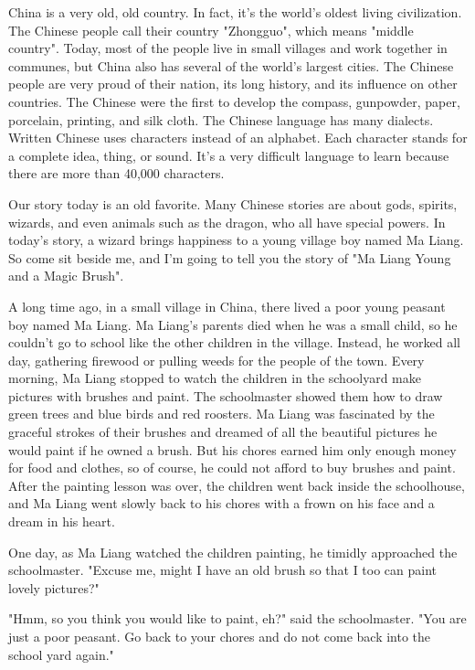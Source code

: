 China is a very old, old country. In fact, it's the world's oldest living civilization. The Chinese people call their country "Zhongguo", which means "middle country". Today, most of the people live in small villages and work together in communes, but China also has several of the world's largest cities. The Chinese people are very proud of their nation, its long history, and its influence on other countries. The Chinese were the first to develop the compass, gunpowder, paper, porcelain, printing, and silk cloth. The Chinese language has many dialects. Written Chinese uses characters instead of an alphabet. Each character stands for a complete idea, thing, or sound. It's a very difficult language to learn because there are more than 40,000 characters.

Our story today is an old favorite. Many Chinese stories are about gods, spirits, wizards, and even animals such as the dragon, who all have special powers. In today's story, a wizard brings happiness to a young village boy named Ma Liang. So come sit beside me, and I'm going to tell you the story of "Ma Liang Young and a Magic Brush".

A long time ago, in a small village in China, there lived a poor young peasant boy named Ma Liang. Ma Liang's parents died when he was a small child, so he couldn't go to school like the other children in the village. Instead, he worked all day, gathering firewood or pulling weeds for the people of the town. Every morning, Ma Liang stopped to watch the children in the schoolyard make pictures with brushes and paint. The schoolmaster showed them how to draw green trees and blue birds and red roosters. Ma Liang was fascinated by the graceful strokes of their brushes and dreamed of all the beautiful pictures he would paint if he owned a brush. But his chores earned him only enough money for food and clothes, so of course, he could not afford to buy brushes and paint. After the painting lesson was over, the children went back inside the schoolhouse, and Ma Liang went slowly back to his chores with a frown on his face and a dream in his heart.

One day, as Ma Liang watched the children painting, he timidly approached the schoolmaster. "Excuse me, might I have an old brush so that I too can paint lovely pictures?"

"Hmm, so you think you would like to paint, eh?" said the schoolmaster. "You are just a poor peasant. Go back to your chores and do not come back into the school yard again."

